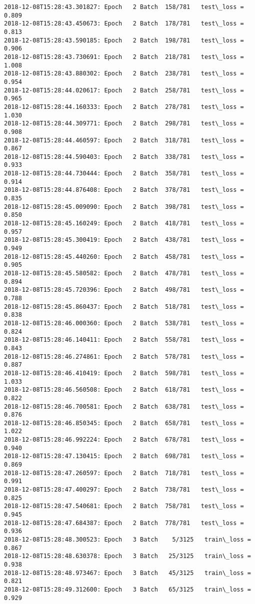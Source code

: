 \documentclass[11pt]{article}
\begin{document}
\begin{Verbatim}[commandchars=\\\{\}]
2018-12-08T15:28:43.301827: Epoch   2 Batch  158/781   test\_loss = 0.809
2018-12-08T15:28:43.450673: Epoch   2 Batch  178/781   test\_loss = 0.813
2018-12-08T15:28:43.590185: Epoch   2 Batch  198/781   test\_loss = 0.906
2018-12-08T15:28:43.730691: Epoch   2 Batch  218/781   test\_loss = 1.008
2018-12-08T15:28:43.880302: Epoch   2 Batch  238/781   test\_loss = 0.954
2018-12-08T15:28:44.020617: Epoch   2 Batch  258/781   test\_loss = 0.965
2018-12-08T15:28:44.160333: Epoch   2 Batch  278/781   test\_loss = 1.030
2018-12-08T15:28:44.309771: Epoch   2 Batch  298/781   test\_loss = 0.908
2018-12-08T15:28:44.460597: Epoch   2 Batch  318/781   test\_loss = 0.867
2018-12-08T15:28:44.590403: Epoch   2 Batch  338/781   test\_loss = 0.933
2018-12-08T15:28:44.730444: Epoch   2 Batch  358/781   test\_loss = 0.914
2018-12-08T15:28:44.876408: Epoch   2 Batch  378/781   test\_loss = 0.835
2018-12-08T15:28:45.009090: Epoch   2 Batch  398/781   test\_loss = 0.850
2018-12-08T15:28:45.160249: Epoch   2 Batch  418/781   test\_loss = 0.957
2018-12-08T15:28:45.300419: Epoch   2 Batch  438/781   test\_loss = 0.949
2018-12-08T15:28:45.440260: Epoch   2 Batch  458/781   test\_loss = 0.905
2018-12-08T15:28:45.580582: Epoch   2 Batch  478/781   test\_loss = 0.894
2018-12-08T15:28:45.720396: Epoch   2 Batch  498/781   test\_loss = 0.788
2018-12-08T15:28:45.860437: Epoch   2 Batch  518/781   test\_loss = 0.838
2018-12-08T15:28:46.000360: Epoch   2 Batch  538/781   test\_loss = 0.824
2018-12-08T15:28:46.140411: Epoch   2 Batch  558/781   test\_loss = 0.843
2018-12-08T15:28:46.274861: Epoch   2 Batch  578/781   test\_loss = 0.887
2018-12-08T15:28:46.410419: Epoch   2 Batch  598/781   test\_loss = 1.033
2018-12-08T15:28:46.560508: Epoch   2 Batch  618/781   test\_loss = 0.822
2018-12-08T15:28:46.700581: Epoch   2 Batch  638/781   test\_loss = 0.876
2018-12-08T15:28:46.850345: Epoch   2 Batch  658/781   test\_loss = 1.022
2018-12-08T15:28:46.992224: Epoch   2 Batch  678/781   test\_loss = 0.940
2018-12-08T15:28:47.130415: Epoch   2 Batch  698/781   test\_loss = 0.869
2018-12-08T15:28:47.260597: Epoch   2 Batch  718/781   test\_loss = 0.991
2018-12-08T15:28:47.400297: Epoch   2 Batch  738/781   test\_loss = 0.825
2018-12-08T15:28:47.540681: Epoch   2 Batch  758/781   test\_loss = 0.945
2018-12-08T15:28:47.684387: Epoch   2 Batch  778/781   test\_loss = 0.936
2018-12-08T15:28:48.300523: Epoch   3 Batch    5/3125   train\_loss = 0.867
2018-12-08T15:28:48.630378: Epoch   3 Batch   25/3125   train\_loss = 0.938
2018-12-08T15:28:48.973467: Epoch   3 Batch   45/3125   train\_loss = 0.821
2018-12-08T15:28:49.312600: Epoch   3 Batch   65/3125   train\_loss = 0.929

\end{Verbatim}
\end{document}
